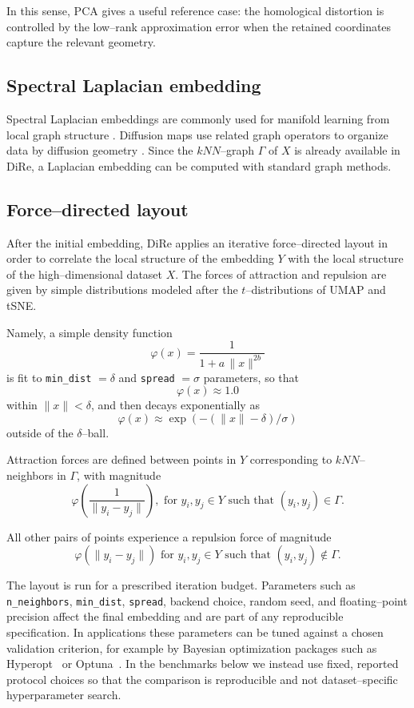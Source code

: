 \documentclass[11pt]{article}
\begin{document}
In this sense, PCA gives a useful reference case: the homological distortion is controlled by the low--rank approximation error when the retained coordinates capture the relevant geometry.

\subsection{Spectral Laplacian embedding}

Spectral Laplacian embeddings are commonly used for manifold learning from local graph structure \cite{tenenbaum-isomap,belkin-niyogi-laplacian}. Diffusion maps use related graph operators to organize data by diffusion geometry \cite{coifman-lafon-diffusion}. Since the $kNN$--graph $\Gamma$ of $X$ is already available in DiRe, a Laplacian embedding can be computed with standard graph methods.

\subsection{Force--directed layout}

After the initial embedding, DiRe applies an iterative force--directed layout in order to correlate the local structure of the embedding $Y$ with the local structure of the high--dimensional dataset $X$. The forces of attraction and repulsion are given by simple distributions modeled after the $t$--distributions of UMAP and tSNE.

Namely, a simple density function 
\[\varphi(x) = \frac{1}{1 + a\, \|x\|^{2b}}\]
is fit to \texttt{min\_dist} $=\delta$ and \texttt{spread} $=\sigma$ parameters, so that 
\[\varphi(x) \approx 1.0\]
within $\|x\| < \delta$, and then decays exponentially as
\[\varphi(x) \approx \exp( - (\|x\| - \delta)/\sigma )\]
outside of the $\delta$--ball. 

Attraction forces are defined between points in $Y$ corresponding to $kNN$--neighbors in $\Gamma$, with magnitude
\[\varphi\left( \frac{1}{\|y_i - y_j\|} \right), \text{ for } y_i, y_j \in Y \text{ such that } (y_i, y_j) \in \Gamma.\]

All other pairs of points experience a repulsion force of magnitude
\[\varphi\left( \|y_i - y_j\| \right) \text{ for } y_i, y_j \in Y \text{ such that } (y_i, y_j) \notin \Gamma.\]

The layout is run for a prescribed iteration budget. Parameters such as \texttt{n\_neighbors}, \texttt{min\_dist}, \texttt{spread}, backend choice, random seed, and floating--point precision affect the final embedding and are part of any reproducible specification. In applications these parameters can be tuned against a chosen validation criterion, for example by Bayesian optimization packages such as Hyperopt~\cite{hyperopt} or Optuna~\cite{optuna}. In the benchmarks below we instead use fixed, reported protocol choices so that the comparison is reproducible and not dataset--specific hyperparameter search.
    
\end{document}
